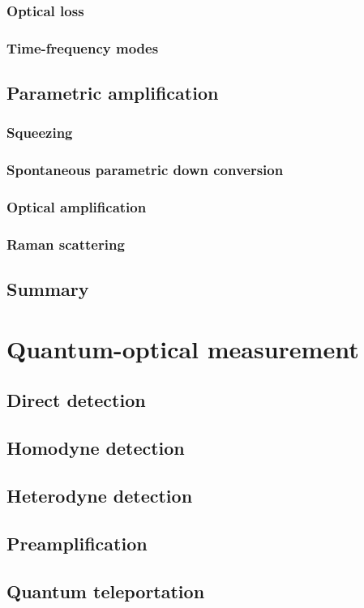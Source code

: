 \documentclass{book}
\begin{document}
\subsection{Optical loss}
\subsection{Time-frequency modes}
\section{Parametric amplification}
\subsection{Squeezing}
\subsection{Spontaneous parametric down conversion}
\subsection{Optical amplification}
\subsection{Raman scattering}
\section{Summary}

\chapter{Quantum-optical measurement}
\section{Direct detection}
\section{Homodyne detection}
\section{Heterodyne detection}
\section{Preamplification}
\section{Quantum teleportation}
\end{document}
